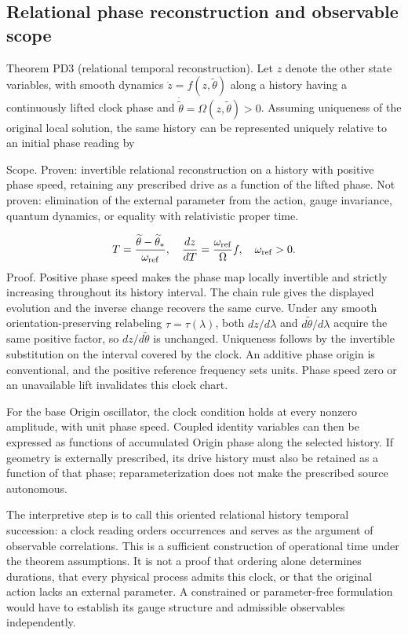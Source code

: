 \documentclass[aip,adv,preprint,floatfix]{revtex4-2}
\begin{document}
\subsection*{Relational phase reconstruction and observable scope}
Theorem PD3 (relational temporal reconstruction). Let $z$ denote the other state variables, with smooth dynamics $\dot z=f(z,\widetilde\theta)$ along a history having a continuously lifted clock phase and $\dot{\widetilde\theta}=\Omega(z,\widetilde\theta)>0$. Assuming uniqueness of the original local solution, the same history can be represented uniquely relative to an initial phase reading by

Scope. Proven: invertible relational reconstruction on a history with positive phase speed, retaining any prescribed drive as a function of the lifted phase. Not proven: elimination of the external parameter from the action, gauge invariance, quantum dynamics, or equality with relativistic proper time.

\begin{equation}
T=\frac{\widetilde\theta-\widetilde\theta_*}{\omega_{\rm ref}},\quad\frac{dz}{dT}=\frac{\omega_{\rm ref}}{\Omega}f,\quad\omega_{\rm ref}>0.
\end{equation}
Proof. Positive phase speed makes the phase map locally invertible and strictly increasing throughout its history interval. The chain rule gives the displayed evolution and the inverse change recovers the same curve. Under any smooth orientation-preserving relabeling $\tau=\tau(\lambda)$, both $dz/d\lambda$ and $d\widetilde\theta/d\lambda$ acquire the same positive factor, so $dz/d\widetilde\theta$ is unchanged. Uniqueness follows by the invertible substitution on the interval covered by the clock. An additive phase origin is conventional, and the positive reference frequency sets units. Phase speed zero or an unavailable lift invalidates this clock chart.

For the base Origin oscillator, the clock condition holds at every nonzero amplitude, with unit phase speed. Coupled identity variables can then be expressed as functions of accumulated Origin phase along the selected history. If geometry is externally prescribed, its drive history must also be retained as a function of that phase; reparameterization does not make the prescribed source autonomous.

The interpretive step is to call this oriented relational history temporal succession: a clock reading orders occurrences and serves as the argument of observable correlations. This is a sufficient construction of operational time under the theorem assumptions. It is not a proof that ordering alone determines durations, that every physical process admits this clock, or that the original action lacks an external parameter. A constrained or parameter-free formulation would have to establish its gauge structure and admissible observables independently.
\end{document}
